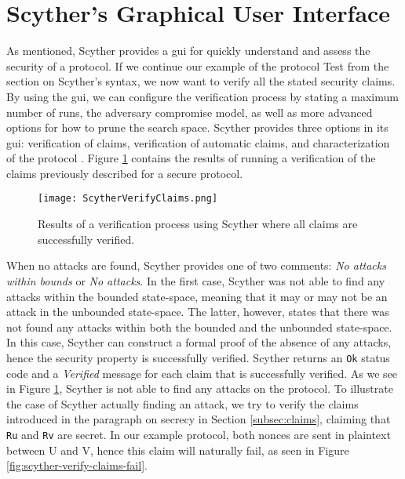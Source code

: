 \section{Scyther's Graphical User Interface}

As mentioned, Scyther provides a \gls{gui} for quickly understand and assess the security of a protocol. If we continue our example of the protocol Test from the section on Scyther's syntax, we now want to verify all the stated security claims. By using the \gls{gui}, we can configure the verification process by stating a maximum number of runs, the adversary compromise model, as well as more advanced options for how to prune the search space. Scyther provides three options in its \gls{gui}: verification of claims, verification of automatic claims, and characterization of the protocol \cite{cremers2008scyther}. Figure \ref{fig:scyther-verify-claims} contains the results of running a verification of the claims previously described for a secure protocol.

\begin{figure}[h]
	\centering
	\texttt{[image: ScytherVerifyClaims.png]}
	\caption{Results of a verification process using Scyther where all claims are successfully verified.}
	\label{fig:scyther-verify-claims}
\end{figure}

When no attacks are found, Scyther provides one of two comments: \emph{No attacks within bounds} or \emph{No attacks}. In the first case, Scyther was not able to find any attacks within the bounded state-space, meaning that it may or may not be an attack in the unbounded state-space. The latter, however, states that there was not found any attacks within both the bounded and the unbounded state-space. In this case, Scyther can construct a formal proof of the absence of any attacks, hence the security property is successfully verified. Scyther returns an \texttt{Ok} status code and a \emph{Verified} message for each claim that is successfully verified. As we see in Figure \ref{fig:scyther-verify-claims}, Scyther is not able to find any attacks on the protocol. To illustrate the case of Scyther actually finding an attack, we try to verify the claims introduced in the paragraph on secrecy in Section \ref{subsec:claims}, claiming that \texttt{Ru} and \texttt{Rv} are secret. In our example protocol, both nonces are sent in plaintext between U and V, hence this claim will naturally fail, as seen in Figure \ref{fig:scyther-verify-claims-fail}.


